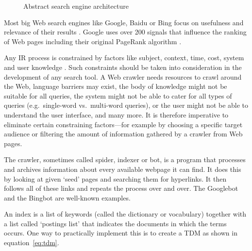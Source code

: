 \begin{figure}[!htbp]
  \centering
\caption[Search engine architecture]{Abstract search engine architecture}
\label{fig:sea}
\end{figure}

Most big Web search engines like Google, Baidu or Bing focus on usefulness and relevance of their results \autocite{Google2012, Baidu2012, Microsoft2012a}. Google uses over \num{200} signals \citeyear{Google2012} that influence the ranking of Web pages including their original PageRank algorithm \autocite{Brin1998, Brin1998b}.

Any \ac{IR} process is constrained by factors like subject, context, time, cost, system and user knowledge \autocite{Marchionini1988}. Such constraints should be taken into consideration in the development of any search tool. A Web crawler needs resources to crawl around the Web, language barriers may exist, the body of knowledge might not be suitable for all queries, the system might not be able to cater for all types of queries (e.g.\ single-word vs.\ multi-word queries), or the user might not be able to understand the user interface, and many more. It is therefore imperative to eliminate certain constraining factors---for example by choosing a specific target audience or filtering the amount of information gathered by a crawler from Web pages.

The crawler, sometimes called spider, indexer or bot, is a program that processes and archives information about every available webpage it can find. It does this by looking at given `seed' pages and searching them for hyperlinks. It then follows all of these links and repeats the process over and over. The Googlebot \citeyear{Google2016} and the Bingbot \citeyear{Bing2016} are well-known examples.

An index is a list of keywords (called the dictionary or vocabulary) together with a list called `postings list' that indicates the documents in which the terms occurs. One way to practically implement this is to create a \ac{TDM} as shown in equation~\ref{eq:tdm}\marginnote{$\bm{\Sigma}$~\ref{eq:tdm}}.

